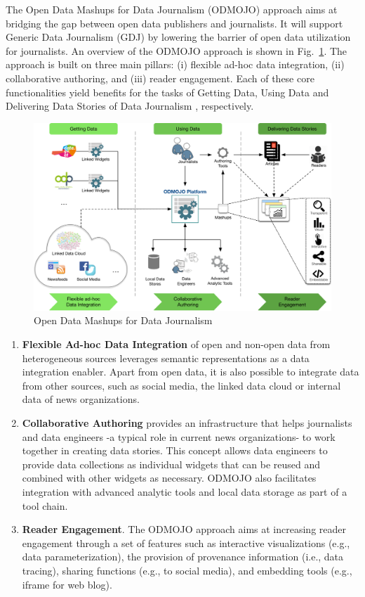 \documentclass[runningheads,a4paper]{llncs}
\makeatletter
\def\maxwidth#1{\ifdim\Gin@nat@width>#1 #1\else\Gin@nat@width\fi}
\makeatother
\begin{document}
The Open Data Mashups for Data Journalism (ODMOJO) approach aims at bridging the gap between open data publishers and journalists. It will support Generic Data Journalism (GDJ) by lowering the barrier of open data utilization for journalists. An overview of the ODMOJO approach is shown in Fig.~\ref{_Ref490485635}. The approach is built on three main pillars: (i) flexible ad-hoc data integration, (ii) collaborative authoring, and (iii) reader engagement. Each of these core functionalities yield benefits for the tasks of Getting Data, Using Data and Delivering Data Stories of Data Journalism  \cite{_Ref490834090}, respectively.
\begin{figure}[h!]
\centering
\includegraphics[width=\maxwidth{\textwidth}]{./img/image1.png}
\cprotect\caption{ Open Data Mashups for Data Journalism}
\label{_Ref490485635}
\end{figure}

\begin{enumerate}
\item {\bf Flexible Ad-hoc Data Integration} of open and non-open data from heterogeneous sources leverages semantic representations as a data integration enabler. Apart from open data, it is also possible to integrate data from other sources, such as social media, the linked data cloud or internal data of news organizations.
\item {\bf Collaborative Authoring} provides an infrastructure that helps journalists and data engineers -a typical role in current news organizations- to work together in creating data stories. This concept allows data engineers to provide data collections as individual widgets that can be reused and combined with other widgets as necessary. ODMOJO also facilitates integration with advanced analytic tools and local data storage as part of a tool chain.
\item {\bf Reader Engagement}. The ODMOJO approach aims at increasing reader engagement through a set of features such as interactive visualizations (e.g., data parameterization), the provision of provenance information (i.e., data tracing), sharing functions (e.g., to social media), and embedding tools (e.g., iframe for web blog).
\end{enumerate}
\end{document}

